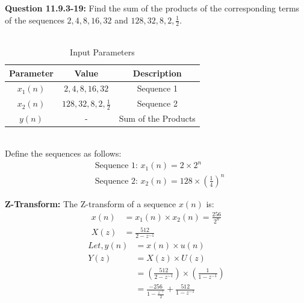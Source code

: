 \documentclass[journal,12pt,twocolumn]{IEEEtran}
\theoremstyle{remark}
\begin{document}
\title{}
\author{Sasa Mardi, EE23BTECH11222}
\date{}
\maketitle
\textbf{Question 11.9.3-19:} Find the sum of the products of the corresponding terms of the sequences $2, 4, 8, 16, 32$ and $128, 32, 8, 2, \frac{1}{2}$.\\
\\
\solution
\begin{table}[h!]
    \centering
    \caption{Input Parameters}
    \label{tab:1}
    \begin{tabular}{ | c | c | c | }
        \hline
        Parameter & Value & Description \\
        \hline
        $x_1(n)$ & $2, 4, 8, 16, 32$ &  Sequence 1 \\
        \hline
        $x_2(n)$ & $128, 32, 8, 2, \frac{1}{2}$ &  Sequence 2 \\
        \hline
        $y(n)$ & - &  Sum of the Products \\
        \hline
    \end{tabular}
\end{table}\\
Define the sequences as follows:\\
\begin{align}
&\text{Sequence 1: } x_1(n) = 2 \times 2^n \\
&\text{Sequence 2: } x_2(n) = 128 \times \left(\frac{1}{4}\right)^n
\end{align}

\textbf{Z-Transform:}
The Z-transform of a sequence \( x(n) \) is:
\begin{align}
x(n) &= x_1(n) \times x_2(n) = \frac{256}{2^{n}} \\
X(z) &= \frac{512}{2 - z^{-1}}
\end{align}
\begin{align}
Let, y(n) &= x(n) \times u(n) \\
 Y(z) &= X(z) \times U(z) \\
 &= \left(\frac{512}{2 - z^{-1}}\right) \times \left(\frac{1}{1 - z^{-1}}\right)\\
 &= \frac{-256}{1 - \frac{z^{-1}}{2}} + \frac{512}{1 - z^{-1}}
\end{align}
\end{document}
